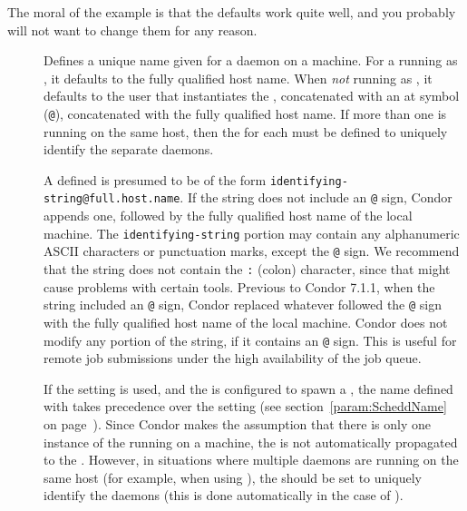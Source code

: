 The moral of the example is that 
the defaults work quite well, and you probably 
will not want to change them for any reason.
\begin{description}

\item[] \label{param:MasterName}
  Defines a unique name given for a  daemon on a machine.
  For a  running as ,
  it defaults to the fully qualified host name.
  When \emph{not} running as ,
  it defaults to the user that instantiates the
  , concatenated with an at symbol (\verb$@$),
  concatenated with the fully qualified host name.
  If more than one  is running on the same host, 
  then the  for each
   must be defined to uniquely identify the separate
  daemons. 

  A defined  is presumed to be of the form
  \verb$identifying-string@full.host.name$.
  If the string does not include an \verb$@$ sign,
  Condor appends one, followed by the fully qualified host name
  of the local machine.
  The \verb$identifying-string$ portion may contain any
  alphanumeric ASCII characters or punctuation marks, except the \verb$@$ sign.
  We recommend that the string does not contain the \verb$:$ (colon)
  character, since that might cause problems with certain tools.
  Previous to Condor 7.1.1, when the string included
  an \verb$@$ sign, Condor replaced whatever followed the \verb$@$
  sign with the fully qualified host name of the local machine.
  Condor does not modify any portion of the string, if it
  contains an \verb$@$ sign.
  This is useful for remote job submissions under the high availability
  of the job queue.

  If the  setting is used, and the
   is configured to spawn a ,
  the name
  defined with  takes precedence over the
   setting (see section~\ref{param:ScheddName} on
  page~\pageref{param:ScheddName}). 
  Since Condor makes the assumption that there is only one
  instance of the  running on a machine,
  the  is not automatically propagated to the
  .
  However, in situations where multiple  daemons are
  running on the same host (for example, when using ),
  the  should be set to uniquely identify 
  the  daemons
  (this is done automatically in the case of ).


\end{description}
